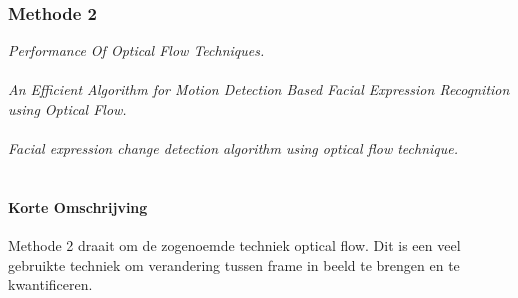 \documentclass[11pt]{article}
\begin{document}
    \subsubsection{Methode 2}

    \emph{\citet{barronperformance} Performance Of Optical Flow Techniques.}\\ \\
    \emph{\citet{naghsh2006efficient} An Efficient Algorithm for Motion Detection Based Facial Expression Recognition using Optical Flow.}\\ \\
    \emph{\citet{zainudinfacialexpression} Facial expression change detection algorithm using optical flow technique.}\\ \\

    \paragraph{Korte Omschrijving}
    Methode 2 draait om de zogenoemde techniek optical flow.
    Dit is een veel gebruikte techniek om verandering tussen frame in beeld te brengen en te kwantificeren.
\end{document}
